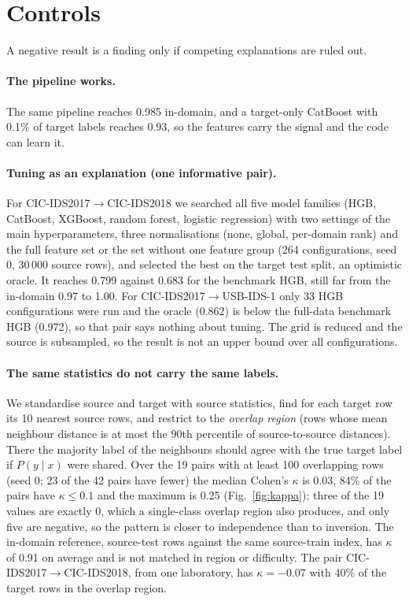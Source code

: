 \documentclass[11pt]{article}
\begin{document}
\section{Controls}\label{sec:controls}
A negative result is a finding only if competing explanations are ruled out.
\paragraph{The pipeline works.}
The same pipeline reaches 0.985 in-domain, and a target-only CatBoost with 0.1\% of target labels reaches 0.93, so the features carry the signal and the code can learn it.

\paragraph{Tuning as an explanation (one informative pair).}
For CIC-IDS2017$\rightarrow$CIC-IDS2018 we searched all five model families (HGB, CatBoost, XGBoost, random forest, logistic regression) with two settings of the main hyperparameters, three normalisations (none, global, per-domain rank) and the full feature set or the set without one feature group (264 configurations, seed 0, 30\,000 source rows), and selected the best on the target test split, an optimistic oracle.
It reaches 0.799 against 0.683 for the benchmark HGB, still far from the in-domain 0.97 to 1.00.
For CIC-IDS2017$\rightarrow$USB-IDS-1 only 33 HGB configurations were run and the oracle (0.862) is below the full-data benchmark HGB (0.972), so that pair says nothing about tuning.
The grid is reduced and the source is subsampled, so the result is not an upper bound over all configurations.

\paragraph{The same statistics do not carry the same labels.}
We standardise source and target with source statistics, find for each target row its 10 nearest source rows, and restrict to the \emph{overlap region} (rows whose mean neighbour distance is at most the 90th percentile of source-to-source distances).
There the majority label of the neighbours should agree with the true target label if $P(y\mid x)$ were shared.
Over the 19 pairs with at least 100 overlapping rows (seed 0; 23 of the 42 pairs have fewer) the median Cohen's $\kappa$ is 0.03, 84\% of the pairs have $\kappa\le0.1$ and the maximum is 0.25 (Fig.~\ref{fig:kappa}); three of the 19 values are exactly 0, which a single-class overlap region also produces, and only five are negative, so the pattern is closer to independence than to inversion. The in-domain reference, source-test rows against the same source-train index, has $\kappa$ of 0.91 on average and is not matched in region or difficulty.
The pair CIC-IDS2017$\rightarrow$CIC-IDS2018, from one laboratory, has $\kappa=-0.07$ with 40\% of the target rows in the overlap region.
\end{document}
